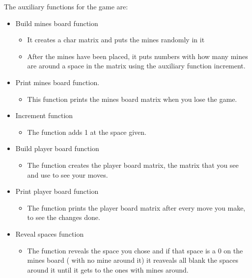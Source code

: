 \documentclass{article}
\begin{document}
  \item The auxiliary functions for the game are:
  
  \begin{itemize}
   \item Build mines board function
        \begin{itemize}
            \item It creates a char matrix and puts the mines randomly in it
            \item After the mines have been placed, it puts numbers with how many mines are around a space in the matrix using the auxiliary function increment.
        \end{itemize}
   \item Print mines board function.
        \begin{itemize}
            \item This function prints the mines board matrix when you lose the game.
        \end{itemize}
   
   \item Increment function
        \begin{itemize}
            \item The function adds 1 at the space given.
        \end{itemize}
   
   \item Build player board function
        \begin{itemize}
            \item The function creates the player board matrix, the matrix that you see and use to see your moves.
        \end{itemize}
   
   \item Print player board function
   
    \begin{itemize}
        \item The function prints the player board matrix after every move you make, to see the changes done.
        \end{itemize}
   
   \item Reveal spaces function
        \begin{itemize}
            \item The function reveals the space you chose and if that space is a 0 on the mines board ( with no mine around it) it reaveals all blank the spaces around it until it gets to the ones with mines around.
        \end{itemize}
   

\end{itemize}
\end{document}

